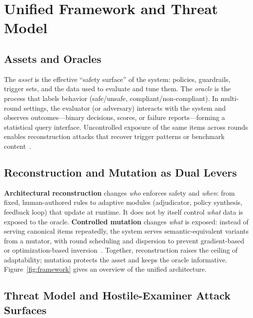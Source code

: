 \documentclass[letterpaper,twocolumn,10pt]{article}
\begin{document}
\section{Unified Framework and Threat Model}
\label{sec:framework}

\subsection{Assets and Oracles}

The \emph{asset} is the effective ``safety surface'' of the system: policies, guardrails, trigger sets, and the data used to evaluate and tune them. The \emph{oracle} is the process that labels behavior (safe/unsafe, compliant/non-compliant). In multi-round settings, the evaluator (or adversary) interacts with the system and observes outcomes---binary decisions, scores, or failure reports---forming a statistical query interface. Uncontrolled exposure of the same items across rounds enables reconstruction attacks that recover trigger patterns or benchmark content~\cite{llm-reconstruction-emergent,ControlledMutation_SafetyEval}.

\subsection{Reconstruction and Mutation as Dual Levers}

\textbf{Architectural reconstruction} changes \emph{who} enforces safety and \emph{when}: from fixed, human-authored rules to adaptive modules (adjudicator, policy synthesis, feedback loop) that update at runtime. It does not by itself control \emph{what} data is exposed to the oracle. \textbf{Controlled mutation} changes \emph{what} is exposed: instead of serving canonical items repeatedly, the system serves semantic-equivalent variants from a mutator, with round scheduling and dispersion to prevent gradient-based or optimization-based inversion~\cite{ControlledMutation_SafetyEval}. Together, reconstruction raises the ceiling of adaptability; mutation protects the asset and keeps the oracle informative. Figure~\ref{fig:framework} gives an overview of the unified architecture.

\subsection{Threat Model and Hostile-Examiner Attack Surfaces}
\end{document}
